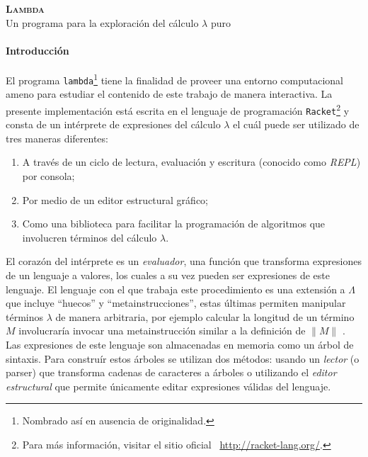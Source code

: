 \documentclass[letterpaper,twoside,openright,11pt]{book}
\date{}
\begin{document}
\begin{center}
  \vspace*{10pt}
  {\Huge\textbf{\textsc{Lambda}}}\\
  \vspace*{5pt}
  {\large Un programa para la exploración del cálculo \( λ \) puro}
  \vspace*{10pt}
\end{center}

\paragraph{Introducción}

El programa {\tt{}lambda}\footnote{Nombrado así en ausencia de originalidad.} tiene la finalidad de proveer una entorno computacional ameno para estudiar el contenido de este trabajo de manera interactiva. La presente implementación está escrita en el lenguaje de programación {\tt{}Racket}\footnote{Para más información, visitar el sitio oficial ~\url{http://racket-lang.org/}.} y consta de un intérprete de expresiones del cálculo \( λ \) el cuál puede ser utilizado de tres maneras diferentes:

\begin{enumerate}
\item A través de un ciclo de lectura, evaluación y escritura (conocido como \emph{REPL}) por consola;
\item Por medio de un editor estructural gráfico;
\item Como una biblioteca para facilitar la programación de algoritmos que involucren términos del cálculo \( λ \).
\end{enumerate}

El corazón del intérprete es un \emph{evaluador}, una función que transforma expresiones de un lenguaje a valores, los cuales a su vez pueden ser expresiones de este lenguaje. El lenguaje con el que trabaja este procedimiento es una extensión a \( Λ \) que incluye ``huecos'' y ``metainstrucciones'', estas últimas permiten manipular términos \( λ \) de manera arbitraria, por ejemplo calcular la longitud de un término \( M \) involucraría invocar una metainstrucción similar a la definición de \( \| M \| \) . Las expresiones de este lenguaje son almacenadas en memoria como un árbol de sintaxis. Para construír estos árboles se utilizan dos métodos: usando un \emph{lector} (o parser) que transforma cadenas de caracteres a árboles o utilizando el \emph{editor estructural} que permite únicamente editar expresiones válidas del lenguaje.
\end{document}
